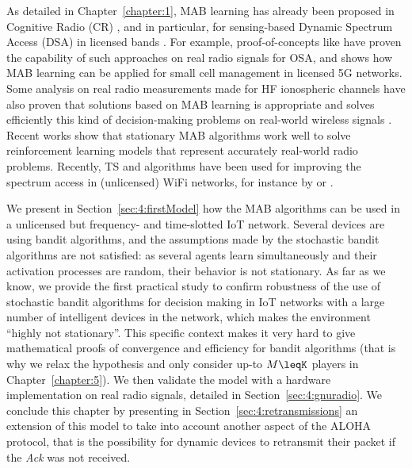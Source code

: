 As detailed in Chapter~\ref{chapter:1},
MAB learning has already been proposed in Cognitive Radio (CR) \cite{Mitola99,Haykin05}, and in particular, for sensing-based Dynamic Spectrum Access (DSA) in licensed bands \cite{Jouini10}.
For example,
proof-of-concepts like \cite{kumar2016two} have proven the capability of such approaches on real radio signals for OSA,
and \cite{Maghsudi16} shows how MAB learning can be applied for small cell management in licensed 5G networks.
Some analysis on real radio measurements made for HF ionospheric channels have also proven that solutions based on MAB learning is appropriate and solves efficiently this kind of decision-making problems on real-world wireless signals \cite{Melian15}.
Recent works show that stationary MAB algorithms work well to solve reinforcement learning models that represent accurately real-world radio problems.
Recently, TS and \UCB{} algorithms have been used for improving the spectrum access in (unlicensed) WiFi networks, for instance by \cite{Toldov16} or \cite{Wilhelmi19collaborative,Wilhelmi19potential}.

We present in Section~\ref{sec:4:firstModel} how the MAB algorithms can be used in a unlicensed but frequency- and time-slotted IoT network.
Several devices are using bandit algorithms, and the assumptions made by the stochastic bandit algorithms are not satisfied: as several agents learn simultaneously and their activation processes are random, their behavior is not stationary.
As far as we know, we provide the first practical study to confirm robustness of the use of stochastic bandit algorithms for decision making in IoT networks with a large number of intelligent devices in the network, which makes the environment ``highly not stationary''.
This specific context makes it very hard to give mathematical proofs of  convergence and efficiency for bandit algorithms (that is why we relax the hypothesis and only consider up-to $M\leqK$ players in Chapter~\ref{chapter:5}).
We then validate the model with a hardware implementation on real radio signals, detailed in Section~\ref{sec:4:gnuradio}.
%
We conclude this chapter by presenting in Section~\ref{sec:4:retransmissions} an extension of this model to take into account another aspect of the ALOHA protocol, that is the possibility for dynamic devices to retransmit their packet if the \emph{Ack} was not received.


